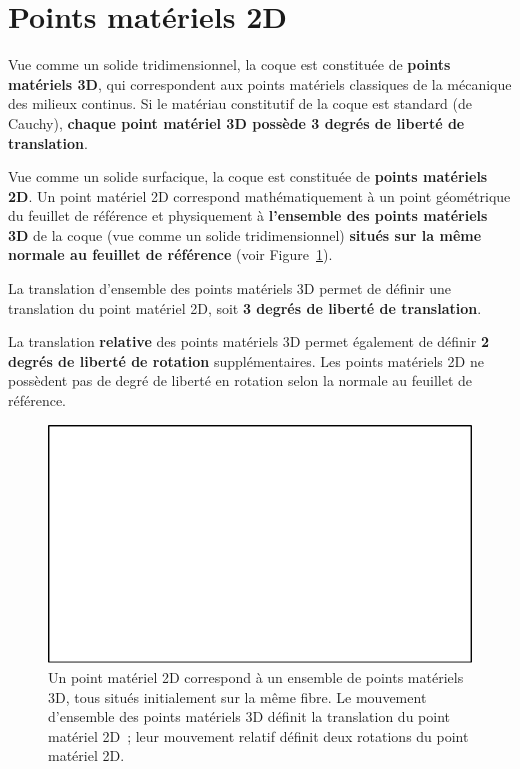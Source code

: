 \documentclass[
  a4paper,
  DIV=11,
  numbers=noendperiod]{scrreprt}
\begin{document}
\hypertarget{points-matuxe9riels-2d}{%
\section{Points matériels 2D}\label{points-matuxe9riels-2d}}

Vue comme un solide tridimensionnel, la coque est constituée de
\textbf{points matériels 3D}, qui correspondent aux points matériels
classiques de la mécanique des milieux continus. Si le matériau
constitutif de la coque est standard (de Cauchy), \textbf{chaque point
matériel 3D possède 3 degrés de liberté de translation}.

Vue comme un solide surfacique, la coque est constituée de
\textbf{points matériels 2D}. Un point matériel 2D correspond
mathématiquement à un point géométrique du feuillet de référence et
physiquement à \textbf{l'ensemble des points matériels 3D} de la coque
(vue comme un solide tridimensionnel) \textbf{situés sur la même normale
au feuillet de référence} (voir Figure~\ref{fig-20230302052722}).

La translation d'ensemble des points matériels 3D permet de définir une
translation du point matériel 2D, soit \textbf{3 degrés de liberté de
translation}.

La translation \textbf{relative} des points matériels 3D permet
également de définir \textbf{2 degrés de liberté de rotation}
supplémentaires. Les points matériels 2D ne possèdent pas de degré de
liberté en rotation selon la normale au feuillet de référence.

\begin{figure}

{\centering \includegraphics{./croquis/blanc.pdf}

}

\caption{\label{fig-20230302052722}Un point matériel 2D correspond à un
ensemble de points matériels 3D, tous situés initialement sur la même
fibre. Le mouvement d'ensemble des points matériels 3D définit la
translation du point matériel 2D~; leur mouvement relatif définit deux
rotations du point matériel 2D.}

\end{figure}
\end{document}
